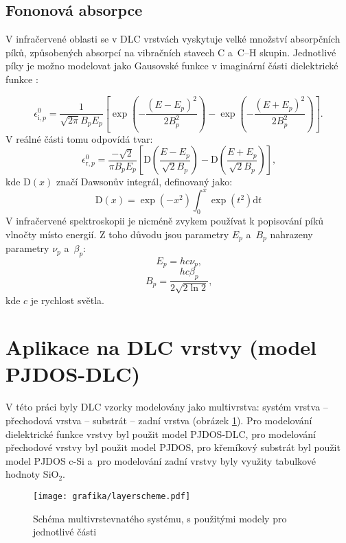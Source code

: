 \subsection{Fononová absorpce}
V infračervené oblasti se v DLC vrstvách vyskytuje velké množství absorpčních píků, způsobených absorpcí na vibračních stavech C a~C--H skupin. Jednotlivé píky je možno modelovat jako Gausovské funkce v imaginární části dielektrické funkce \cite{franta2007}:

\begin{equation}
\label{gaus}
\epsilon^0_{\mathrm{i},p} = \frac{1}{\sqrt{2 \pi} B_p E_p} \left[ \exp\left(-\frac{(E-E_p)^2}{2B_p^2}\right) - \exp\left(-\frac{(E+E_p)^2}{2B_p^2}\right) \right] \text{.}
\end{equation}
V reálné části tomu odpovídá tvar:
\begin{equation}
\epsilon^0_{\mathrm{r},p} = \frac{-\sqrt{2}}{\pi B_p E_p} \left[ \mathrm{D}\left(\frac{E-E_p}{\sqrt{2}B_p}\right) - \mathrm{D}\left(\frac{E+E_p}{\sqrt{2}B_p}\right) \right] \text{,}
\end{equation}
kde $\mathrm{D}(x)$ značí Dawsonův integrál, definovaný jako:
\begin{equation}
\mathrm{D}(x) = \exp(-x^2)\int_0^x \exp(t^2) \mathrm{d}t
\end{equation}
V infračervené spektroskopii je nicméně zvykem používat k popisování píků vlnočty místo energií. Z toho důvodu jsou parametry $E_p$ a~$B_p$ nahrazeny parametry $\nu_p$ a~$\beta_p$:
\begin{equation}
E_p = h c \nu_p \text{,}
\end{equation}
\begin{equation}
B_p = \frac{h c \beta_p}{2 \sqrt{2 \ln 2}} \text{,}
\end{equation}
kde $c$ je rychlost světla. 




\section{Aplikace na DLC vrstvy (model PJDOS-DLC)}
V této práci byly DLC vzorky modelovány jako multivrstva: systém vrstva -- přechodová vrstva -- substrát -- zadní vrstva (obrázek \ref{layerscheme}). Pro modelování dielektrické funkce vrstvy byl použit model PJDOS-DLC, pro modelování přechodové vrstvy byl použit model PJDOS, pro křemíkový substrát byl použit model PJDOS c-Si a~pro modelování zadní vrstvy byly využity tabulkové hodnoty SiO$_2$.

\begin{figure}[h]
\centering
\texttt{[image: grafika/layerscheme.pdf]}
\caption{Schéma multivrstevnatého systému, s použitými modely pro jednotlivé části}
\label{layerscheme}
\end{figure} 

